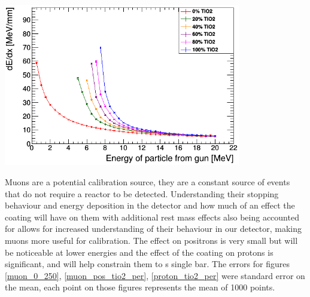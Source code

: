 \documentclass[12pt,a4paper]{article}
\newenvironment{Figure}
  {\par\medskip\noindent\minipage{\linewidth}}
  {\endminipage\par\medskip}
\begin{document}
\begin{Figure}
 \centering
 \includegraphics[height=71mm]{proton_TiO2__.png}
 \label{proton_tio2_per}
\end{Figure}

Muons are a potential calibration source, they are a constant source of events that do not require a reactor to be detected. Understanding their stopping behaviour and energy deposition in the detector and how much of an effect the coating will have on them with additional rest mass effects also being accounted for allows for increased understanding of their behaviour in our detector, making muons more useful for calibration. The effect on positrons is very small but will be noticeable at lower energies and the effect of the coating on protons is significant, and will help constrain them to s single bar. The errors for figures \ref{muon_0_250}, \ref{muon_pos_tio2_per}, \ref{proton_tio2_per} were standard error on the mean, each point on those figures represents the mean of 1000 points.
\end{document}

